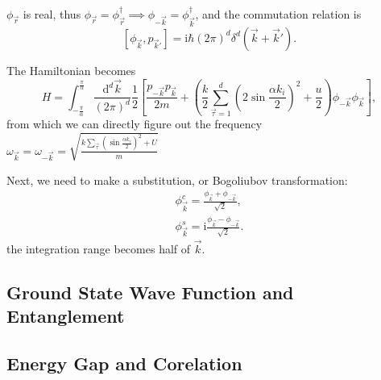 $\phi_{\vec{r}}$ is real, thus $\phi_{\vec{r}} = \phi_{\vec{r}}^\dagger \implies \phi_{-\vec{k}} = \phi_{\vec{k}}^\dagger$, and the commutation relation is
\begin{equation}
  \left[ \phi_{\vec{k}}, p_{\vec{k}'} \right] = \mathrm{i} \hbar (2\pi)^d \delta^{d}(\vec{k} + \vec{k}').
\end{equation}

The Hamiltonian becomes
\begin{equation}
  H = \int_{-\frac{\pi}{\alpha}}^{\frac{\pi}{\alpha}} \frac{\mathrm{d} ^d \vec{k}}{(2\pi)^d}\frac{1}{2}
  \left[ 
    \frac{p_{-\vec{k}}p_{\vec{k}}}{2m} + \left( \frac{k}{2} \sum_{\vec{\tau} = 1}^d \left( 2 \sin \frac{\alpha k_i}{2} \right) ^2 + \frac{u}{2}  \right) \phi_{-\vec{k}}\phi_{\vec{k}}
   \right] ,
\end{equation}
from which we can directly figure out the frequency $\omega_{\vec{k}} = \omega_{-\vec{k}} = \sqrt{\frac{k \sum_{\vec{\tau}} \left( \sin \frac{\alpha k_i}{2} \right) ^2 + U}{m}}$

Next, we need to make a substitution, or Bogoliubov transformation:
\begin{align}
  \phi_{\vec{k}}^c = \frac{\phi_{\vec{k}}+\phi_{-\vec{k}}}{\sqrt{2}},
  \\
  \phi_{\vec{k}}^s = \mathrm{i} \frac{\phi_{\vec{k}} - \phi_{-\vec{k}}}{\sqrt{2}}.
\end{align}
the integration range becomes half of $\vec{k}$.




\subsection{Ground State Wave Function and Entanglement}
\subsection{Energy Gap and Corelation}